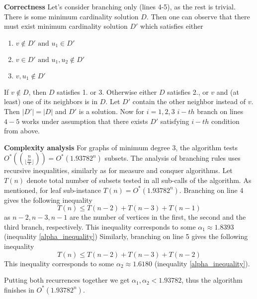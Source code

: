 \textbf{Correctness} Let's consider branching only (lines 4-5), as the rest is trivial. There is some minimum cardinality solution $D$. Then one can observe that there must exist minimum cardinality solution $D'$ which satisfies either
\begin{enumerate}
    \item $v \notin D' \text{ and } u_1 \in D'$
    \item $v \in D' \text{ and } u_1, u_2 \notin D'$
    \item $v, u_1 \notin D'$
\end{enumerate}
If $v \notin D$, then $D$ satisfies 1. or 3. Otherwise either $D$ satisfies 2., or $v$ and (at least) one of its neighbors is in $D$. Let $D'$ contain the other neighbor instead of $v$. Then $|D'| = |D|$ and $D'$ is a solution. Now for $i = 1,2,3$ $i-th$ branch on lines $4-5$ works under assumption that there exists $D'$ satisfying $i-th$ condition from above.  
\par\textbf{Complexity analysis}
For graphs of minimum degree 3, the algorithm tests $O^*(\binom{n}{\lfloor\frac{3n}{8}\rfloor}) = O^*(1.93782^n)$ subsets. The analysis of branching rules uses recursive inequalities, similarly as for measure and conquer algorithms. Let $T(n)$ denote total number of subsets tested in all sub-calls of the algorithm. As mentioned, for leaf sub-instance $T(n) = O^*(1.93782^n)$. Branching on line 4 gives the following inequality
$$
T(n) \leq T(n-2) + T(n-3) + T(n-1)
$$
as $n-2, n-3, n-1$ are the number of vertices in the first, the second and the third branch, respectively. This inequality corresponds to some $\alpha_1 \approx 1.8393$ (inequality \eqref{alpha_inequality})
Similarly, branching on line 5 gives the following inequality
$$
T(n) \leq T(n-2) + T(n-3) + T(n-2)
$$
This inequality corresponds to some $\alpha_2 \approx 1.6180$ (inequality \eqref{alpha_inequality}).

Putting both recurrences together we get $\alpha_1, \alpha_2 < 1.93782$, thus the algorithm finishes in $O^*(1.93782^n)$.
